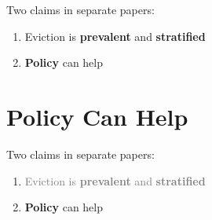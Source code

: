 \documentclass{beamer}
\newcommand\bblue[1]{{\color{blue}\textbf{#1}}}
\begin{document}
\begin{frame}
Two claims in separate papers:
\begin{enumerate}
\item Eviction is \bblue{prevalent} and \bblue{stratified}
\item \bblue{Policy} can help
\end{enumerate}
\end{frame}

\section{Policy Can Help}

\begin{frame}
Two claims in separate papers:
\begin{enumerate}
\item \textcolor{gray}{Eviction is \textbf{prevalent} and \textbf{stratified}}
\item \bblue{Policy} can help
\end{enumerate}
\end{frame}
\end{document}
